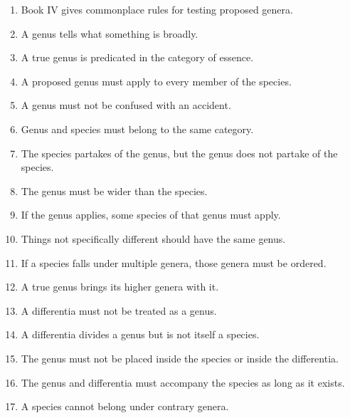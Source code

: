 \documentclass[12pt]{article}
\begin{document}
\begin{enumerate}[itemsep=0.5em]
    \item Book IV gives commonplace rules for testing proposed genera.

    \item A genus tells what something is broadly.

    \item A true genus is predicated in the category of essence.

    \item A proposed genus must apply to every member of the species.

    \item A genus must not be confused with an accident.

    \item Genus and species must belong to the same category.

    \item The species partakes of the genus, but the genus does not partake of
    the species.

    \item The genus must be wider than the species.

    \item If the genus applies, some species of that genus must apply.

    \item Things not specifically different should have the same genus.

    \item If a species falls under multiple genera, those genera must be
    ordered.

    \item A true genus brings its higher genera with it.

    \item A differentia must not be treated as a genus.

    \item A differentia divides a genus but is not itself a species.

    \item The genus must not be placed inside the species or inside the
    differentia.

    \item The genus and differentia must accompany the species as long as it
    exists.

    \item A species cannot belong under contrary genera.


\end{enumerate}
\end{document}
